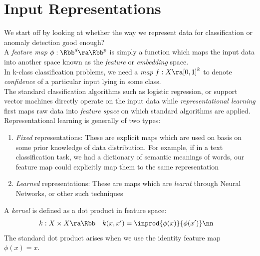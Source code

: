 \documentclass[11pt]{report}
\begin{document}


\maketitle



\section{Input Representations}

We start off by looking at whether the way we represent data for classification or anomaly detection good enough?
\vspace{1mm}
\\A \emph{feature map} \(\phi :\Rbb^d \ra \Rbb^p\) is simply a function which maps the input data into another space known as the \emph{feature} or \emph{embedding} space. 
\vspace{1mm}
\\In k-class classification problems, we need a \emph{map} \(f: X \ra [0,1]^k\) to denote \emph{confidence} of a particular input lying in some class.
\vspace{1mm}
\\The standard classification algorithms such as logistic regression, or support vector machines directly operate on the input data while \emph{representational learning} first maps raw data into \emph{feature space} on which standard algorithms are applied. Representational learning is generally of two types:

\begin{enumerate}[label=\textup{(\alph*)}, leftmargin=*, widest=b, align=left]



\item \label{mpp:gen_a_0} \emph{Fixed} representations: These are explicit maps which are used on basis on some prior knowledge of data distribution. For example, if in a text classification task, we had a dictionary of semantic meanings of words, our feature map could explicitly map them to the same representation
\item \label{mpp:gen_a_1} \emph{Learned} representations: These are maps which are \emph{learnt} through Neural Networks, or other such techniques

 \end{enumerate}
 \vspace{1mm}
A \emph{kernel} is defined as a dot product in feature space:
\begin{align}
    \begin{aligned}
     &k: X \times X \ra \Rbb && k(x,x')=\inprod{\phi(x)}{\phi(x')} \nn
    \end{aligned}   
\end{align}
The standard dot product arises when we use the identity feature map \(\phi(x)=x\).
\end{document}

